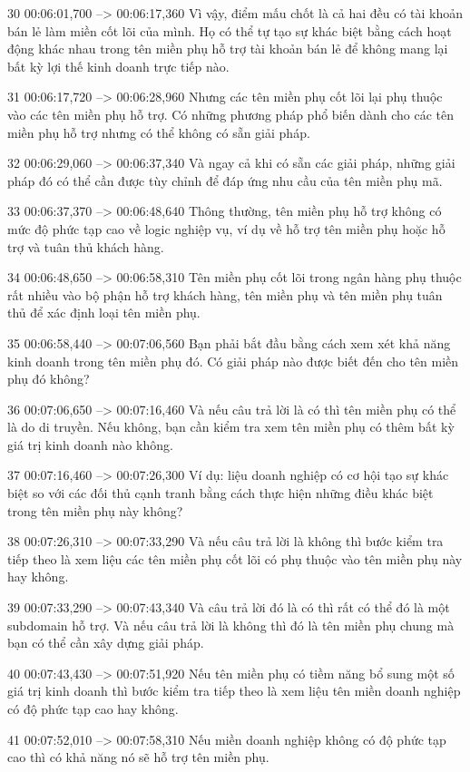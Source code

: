 30
00:06:01,700 --> 00:06:17,360
Vì vậy, điểm mấu chốt là cả hai đều có tài khoản bán lẻ làm miền cốt lõi của mình.  Họ có thể tự tạo sự khác biệt bằng cách hoạt động khác nhau trong tên miền phụ hỗ trợ tài khoản bán lẻ để không mang lại bất kỳ lợi thế kinh doanh trực tiếp nào.

31
00:06:17,720 --> 00:06:28,960
Nhưng các tên miền phụ cốt lõi lại phụ thuộc vào các tên miền phụ hỗ trợ.  Có những phương pháp phổ biến dành cho các tên miền phụ hỗ trợ nhưng có thể không có sẵn giải pháp.

32
00:06:29,060 --> 00:06:37,340
Và ngay cả khi có sẵn các giải pháp, những giải pháp đó có thể cần được tùy chỉnh để đáp ứng nhu cầu của tên miền phụ mã.

33
00:06:37,370 --> 00:06:48,640
Thông thường, tên miền phụ hỗ trợ không có mức độ phức tạp cao về logic nghiệp vụ, ví dụ về hỗ trợ tên miền phụ hoặc hỗ trợ và tuân thủ khách hàng.

34
00:06:48,650 --> 00:06:58,310
Tên miền phụ cốt lõi trong ngân hàng phụ thuộc rất nhiều vào bộ phận hỗ trợ khách hàng, tên miền phụ và tên miền phụ tuân thủ để xác định loại tên miền phụ.

35
00:06:58,440 --> 00:07:06,560
Bạn phải bắt đầu bằng cách xem xét khả năng kinh doanh trong tên miền phụ đó.  Có giải pháp nào được biết đến cho tên miền phụ đó không?

36
00:07:06,650 --> 00:07:16,460
Và nếu câu trả lời là có thì tên miền phụ có thể là do di truyền.  Nếu không, bạn cần kiểm tra xem tên miền phụ có thêm bất kỳ giá trị kinh doanh nào không.

37
00:07:16,460 --> 00:07:26,300
Ví dụ: liệu doanh nghiệp có cơ hội tạo sự khác biệt so với các đối thủ cạnh tranh bằng cách thực hiện những điều khác biệt trong tên miền phụ này không?

38
00:07:26,310 --> 00:07:33,290
Và nếu câu trả lời là không thì bước kiểm tra tiếp theo là xem liệu các tên miền phụ cốt lõi có phụ thuộc vào tên miền phụ này hay không.

39
00:07:33,290 --> 00:07:43,340
Và câu trả lời đó là có thì rất có thể đó là một subdomain hỗ trợ.  Và nếu câu trả lời là không thì đó là tên miền phụ chung mà bạn có thể cần xây dựng giải pháp.

40
00:07:43,430 --> 00:07:51,920
Nếu tên miền phụ có tiềm năng bổ sung một số giá trị kinh doanh thì bước kiểm tra tiếp theo là xem liệu tên miền doanh nghiệp có độ phức tạp cao hay không.

41
00:07:52,010 --> 00:07:58,310
Nếu miền doanh nghiệp không có độ phức tạp cao thì có khả năng nó sẽ hỗ trợ tên miền phụ.

